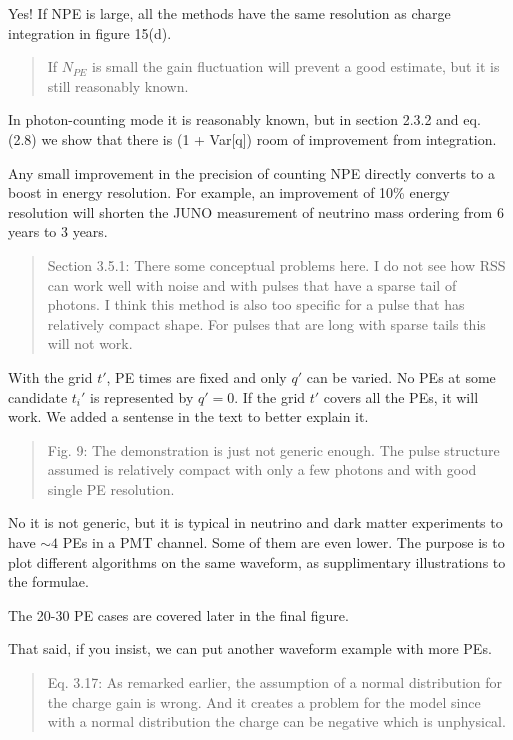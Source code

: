 \documentclass[12pt]{article}
\begin{document}
Yes! If NPE is large, all the methods have the same resolution as charge integration in figure 15(d).

\begin{quote}
If $N_{PE}$ is small the gain fluctuation will prevent a good estimate, but it is still reasonably known.
\end{quote}

In photon-counting mode it is reasonably known, but in section 2.3.2 and eq. (2.8) we show that there is (1 + Var[q]) room of improvement from integration.

Any small improvement in the precision of counting NPE directly converts to a boost in energy resolution. For example, an improvement of 10\% energy resolution will shorten the JUNO measurement of neutrino mass ordering from 6 years to 3 years.

\begin{quote}
Section 3.5.1: There some conceptual problems here. I do not see how RSS can work well with noise and with pulses that have a sparse tail of photons. I think this method is also too specific for a pulse that has relatively compact shape. For pulses that are long with sparse tails this will not work.
\end{quote}

With the grid $t'$, PE times are fixed and only $q'$ can be varied.  No PEs at some candidate $t_i'$ is represented by $q'=0$.  If the grid $t'$ covers all the PEs, it will work.  We added a sentense in the text to better explain it.

\begin{quote}
Fig. 9: The demonstration is just not generic enough. The pulse structure assumed is relatively compact with only a few photons and with good single PE resolution.
\end{quote}

No it is not generic, but it is typical in neutrino and dark matter experiments to have $\sim 4$ PEs in a PMT channel.  Some of them are even lower. The purpose is to plot different algorithms on the same waveform, as supplimentary illustrations to the formulae.

The 20-30 PE cases are covered later in the final figure.

That said, if you insist, we can put another waveform example with more PEs.

\begin{quote}
Eq. 3.17: As remarked earlier, the assumption of a normal distribution for the charge gain is wrong. And it creates a problem for the model since with a normal distribution the charge can be negative which is unphysical.
\end{quote}
\end{document}
